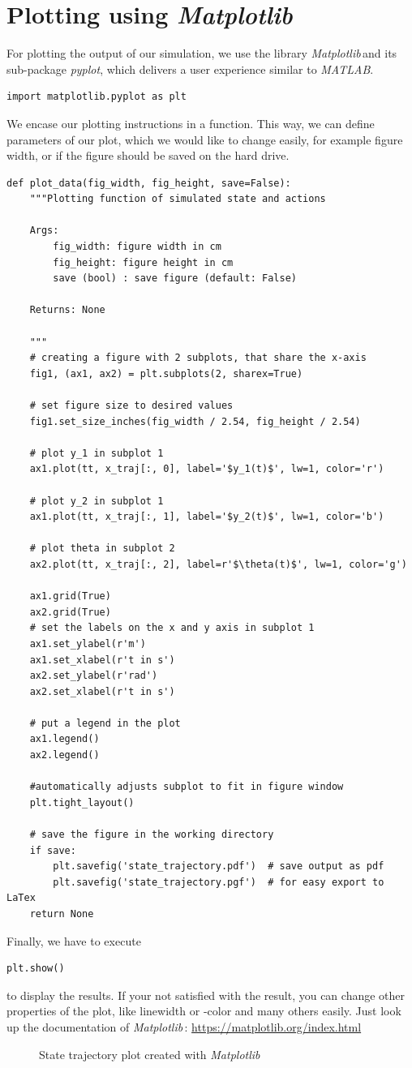 \documentclass[a4paper,11pt,headings=standardclasses]{scrartcl}%
\newcommand{\mpl}{\emph{Matplotlib}\,}
\begin{document}
\section{Plotting using \mpl}
\label{sec:plot}
For plotting the output of our simulation, we use the library \mpl and its sub-package \emph{pyplot}, which delivers a user experience similar to \emph{MATLAB}.
\begin{lstlisting}
import matplotlib.pyplot as plt
\end{lstlisting}
We encase our plotting instructions in a function. This way, we can define parameters of our plot, which we would like to change easily, for example figure width, or if the figure should be saved on the hard drive.
\begin{lstlisting}
def plot_data(fig_width, fig_height, save=False):
    """Plotting function of simulated state and actions

    Args:
        fig_width: figure width in cm
        fig_height: figure height in cm
        save (bool) : save figure (default: False)

    Returns: None

    """
    # creating a figure with 2 subplots, that share the x-axis
    fig1, (ax1, ax2) = plt.subplots(2, sharex=True)

    # set figure size to desired values
    fig1.set_size_inches(fig_width / 2.54, fig_height / 2.54)

    # plot y_1 in subplot 1
    ax1.plot(tt, x_traj[:, 0], label='$y_1(t)$', lw=1, color='r')

    # plot y_2 in subplot 1
    ax1.plot(tt, x_traj[:, 1], label='$y_2(t)$', lw=1, color='b')

    # plot theta in subplot 2
    ax2.plot(tt, x_traj[:, 2], label=r'$\theta(t)$', lw=1, color='g')

    ax1.grid(True)
    ax2.grid(True)
    # set the labels on the x and y axis in subplot 1
    ax1.set_ylabel(r'm')
    ax1.set_xlabel(r't in s')
    ax2.set_ylabel(r'rad')
    ax2.set_xlabel(r't in s')

    # put a legend in the plot
    ax1.legend()
    ax2.legend()

    #automatically adjusts subplot to fit in figure window
    plt.tight_layout()

    # save the figure in the working directory
    if save:
        plt.savefig('state_trajectory.pdf')  # save output as pdf
        plt.savefig('state_trajectory.pgf')  # for easy export to LaTex
    return None
\end{lstlisting}
Finally, we have to execute
\begin{lstlisting}
plt.show()
\end{lstlisting}
to display the results. If your not satisfied with the result, you can change other properties of the plot, like linewidth or -color and many others easily. Just look up the documentation of \mpl : \url{https://matplotlib.org/index.html}
\begin{figure}[h]
\label{fig:state_traj}
   \centering      
         
 \caption{State trajectory plot created with \mpl}
 \label{fig:Test}
\end{figure} 
\end{document}
